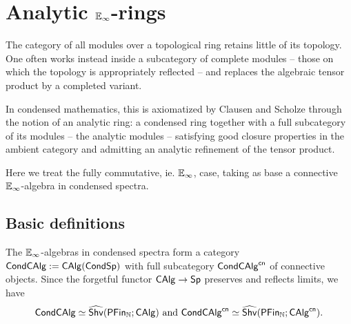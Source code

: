 \section{Analytic \texorpdfstring{$\mathbb{E}_{\infty}$}{E-infinity}-rings}\label{sec: analytic rings}
The category of all modules over a topological ring retains little of its topology. One often works instead inside a subcategory of complete modules -- those on which the topology is appropriately reflected -- and replaces the algebraic tensor product by a completed variant. 

In condensed mathematics, this is axiomatized by Clausen and Scholze \cite[Lecture VII]{Condensed} through the notion of an analytic ring: a condensed ring together with a full subcategory of its modules -- the analytic modules -- satisfying good closure properties in the ambient category and admitting an analytic refinement of the tensor product. 

Here we treat the fully commutative, ie. $\mathbb{E}_{\infty}$, case, taking as base a connective $\mathbb{E}_{\infty}$-algebra in condensed spectra.
\subsection{Basic definitions}\label{subsec: basic definitions}
The $\mathbb{E}_{\infty}$-algebras in condensed spectra form a category $\mathsf{Cond}\mathsf{CAlg}:=\mathsf{CAlg}(\mathsf{Cond}\mathsf{Sp})$ with full subcategory $\mathsf{Cond}\mathsf{CAlg}^{\mathsf{cn}}$ of connective objects. Since the forgetful functor $\mathsf{CAlg}\to\mathsf{Sp}$ preserves and reflects limits, we have 
$$\mathsf{Cond}\mathsf{CAlg}\simeq\widehat{\mathsf{Shv}}(\mathsf{PFin}_{\mathbb{N}};\mathsf{CAlg})\text{ and }\mathsf{Cond}\mathsf{CAlg}^{\mathsf{cn}}\simeq\widehat{\mathsf{Shv}}(\mathsf{PFin}_{\mathbb{N}};\mathsf{CAlg}^{\mathsf{cn}}).$$

